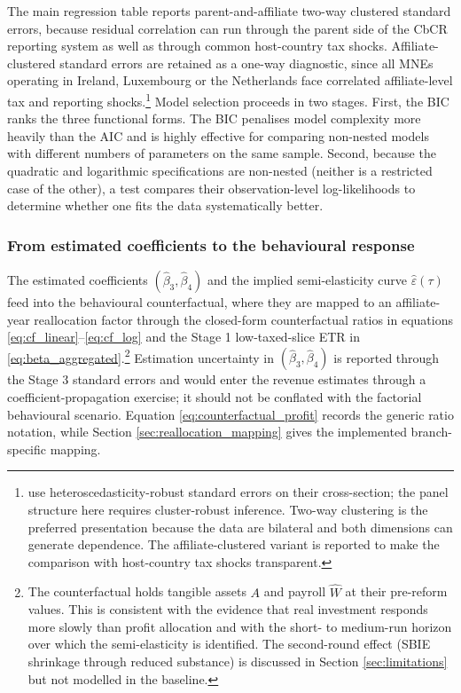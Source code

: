 \documentclass[11pt,a4paper]{article}
\begin{document}
The main regression table reports parent-and-affiliate two-way clustered standard errors, because residual correlation can run through the parent side of the CbCR reporting system as well as through common host-country tax shocks. Affiliate-clustered standard errors are retained as a one-way diagnostic, since all MNEs operating in Ireland, Luxembourg or the Netherlands face correlated affiliate-level tax and reporting shocks.\footnote{\citet{garcia-bernardo2024} use heteroscedasticity-robust standard errors on their cross-section; the panel structure here requires cluster-robust inference. Two-way clustering is the preferred presentation because the data are bilateral and both dimensions can generate dependence. The affiliate-clustered variant is reported to make the comparison with host-country tax shocks transparent.} Model selection proceeds in two stages. First, the BIC ranks the three functional forms. The BIC penalises model complexity more heavily than the AIC and is highly effective for comparing non-nested models with different numbers of parameters on the same sample. Second, because the quadratic and logarithmic specifications are non-nested (neither is a restricted case of the other), a \citet{vuong1989} test compares their observation-level log-likelihoods to determine whether one fits the data systematically better.

\subsubsection{From estimated coefficients to the behavioural response}\label{sec:counterfactual}

The estimated coefficients $(\hat{\beta}_3, \hat{\beta}_4)$ and the implied semi-elasticity curve $\hat{\varepsilon}(\tau)$ feed into the behavioural counterfactual, where they are mapped to an affiliate-year reallocation factor through the closed-form counterfactual ratios in equations \eqref{eq:cf_linear}--\eqref{eq:cf_log} and the Stage 1 low-taxed-slice ETR in \eqref{eq:beta_aggregated}.\footnote{The counterfactual holds tangible assets $A$ and payroll $\hat{W}$ at their pre-reform values. This is consistent with the evidence that real investment responds more slowly than profit allocation \citep{suarezserrato2018} and with the short- to medium-run horizon over which the semi-elasticity is identified. The second-round effect (SBIE shrinkage through reduced substance) is discussed in Section \ref{sec:limitations} but not modelled in the baseline.} Estimation uncertainty in $(\hat{\beta}_3, \hat{\beta}_4)$ is reported through the Stage 3 standard errors and would enter the revenue estimates through a coefficient-propagation exercise; it should not be conflated with the factorial behavioural scenario. Equation \eqref{eq:counterfactual_profit} records the generic ratio notation, while Section \ref{sec:reallocation_mapping} gives the implemented branch-specific mapping.
\end{document}
